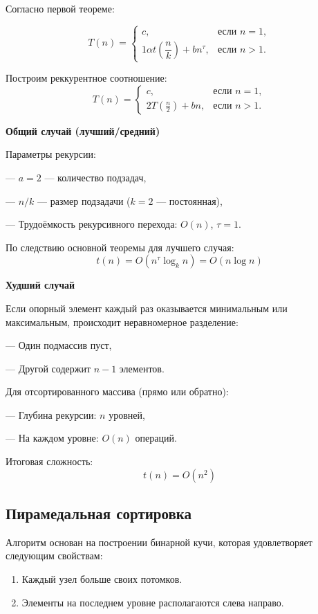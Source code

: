 \documentclass[otchet]{SCWorks}
\begin{document}
Согласно первой теореме:

\[
T(n) = 
\begin{cases}
c, & \text{если } n = 1, \\
1\alpha t \left(\dfrac{n}{k}\right) + bn^\tau, & \text{если } n > 1.
\end{cases}
\]

Построим реккурентное соотношение:
$$
T(n) = 
\begin{cases} 
c, & \text{если } n = 1, \\
2T\left(\frac{n}{2}\right) + bn, & \text{если } n > 1.
\end{cases}
$$

\textbf{Общий случай (лучший/средний)}

Параметры рекурсии:

--- $a = 2$ — количество подзадач,
    
--- $n/k$ — размер подзадачи ($k = 2$ — постоянная),
    
--- Трудоёмкость рекурсивного перехода: $O(n)$, $\tau = 1$.

По следствию основной теоремы для лучшего случая:
\[
t(n) = O(n^\tau \log_k n) = O(n \log n)
\]

\textbf{Худший случай}

Если опорный элемент каждый раз оказывается минимальным или максимальным, происходит неравномерное разделение:

    
--- Один подмассив пуст,
    
--- Другой содержит $n - 1$ элементов.

Для отсортированного массива (прямо или обратно):

    
--- Глубина рекурсии: $n$ уровней,
    
--- На каждом уровне: $O(n)$ операций.


Итоговая сложность:
\[
t(n) = O(n^2)
\]


\subsection{Пирамедальная сортировка}

Алгоритм основан на построении бинарной кучи, которая удовлетворяет следующим свойствам:
\begin{enumerate}
    \item Каждый узел больше своих потомков.
    \item Элементы на последнем уровне располагаются слева направо.
\end{enumerate}
\end{document}
